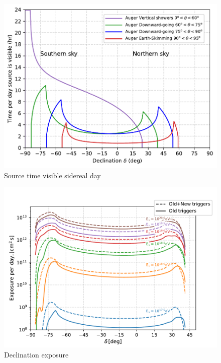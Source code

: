 \begin{figure}[t!]
  \centering
  \includegraphics[width=14.5cm]{thesis_figures/PointLimits/Time_per_day.pdf}
  \caption{Source time visible sidereal day}
  \label{fig:time_per_day}
\end{figure}



\begin{figure}[t!]
  \centering
  \includegraphics[width=14.5cm]{thesis_figures/PointLimits/Exposure_vs_Dec.pdf}
  \caption{Declination exposure}
  \label{fig:Exp_dec}
\end{figure}


